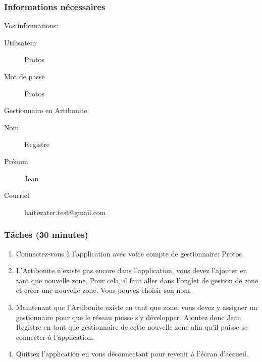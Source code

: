 \documentclass[a4paper, 11pt]{article}
\begin{document}
    \subsubsection*{Informations nécessaires}
        \begin{multicols}{2}
            Vos informations:
            \begin{description}
                \item[Utilisateur] Protos
                \item[Mot de passe] Protos
            \end{description}
            \vfill\null
            \columnbreak

            Gestionnaire en Artibonite:
            \begin{description}
                \item[Nom] Registre
                \item[Prénom] Jean
                \item[Courriel] haitiwater.test@gmail.com
            \end{description}
        \end{multicols}

    \subsubsection*{Tâches (30 minutes)}
        \begin{enumerate}
            \item Connectez-vous à l'application avec votre compte de gestionnaire: Protos.
            \item L’Artibonite n’existe pas encore dans l'application, vous devez l’ajouter en tant que nouvelle zone. Pour cela, il faut aller dans l’onglet de gestion de zone et créer une nouvelle zone. Vous pouvez choisir son nom.
            \item Maintenant que l’Artibonite existe en tant que zone, vous devez y assigner un gestionnaire pour que le réseau puisse s’y développer. Ajoutez donc Jean Registre en tant que gestionnaire de cette nouvelle zone afin qu’il puisse se connecter à l’application.
            \item Quittez l’application en vous déconnectant pour revenir à l’écran d’accueil.
        \end{enumerate}
\newpage
\end{document}
